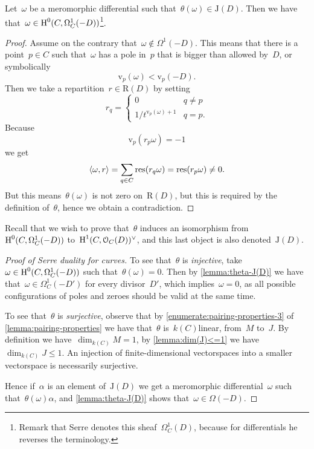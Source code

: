 \documentclass[10pt,a4paper]{article}
\begin{document}
\begin{lemma}
  \label{lemma:theta-J(D)}
  Let~$\omega$ be a meromorphic differential such that~$\theta(\omega)\in\mathrm{J}(D)$. Then we have that~$\omega\in\operatorname{H}^0(C,\Omega_C^1(-D))$\footnote{Remark that Serre denotes this sheaf~$\Omega_C^1(D)$, because for differentials he reverses the terminology.}.

  \begin{proof}
    Assume on the contrary that~$\omega\notin\Omega^1(-D)$. This means that there is a point~$p\in C$ such that~$\omega$ has a pole in~$p$ that is bigger than allowed by~$D$, or symbolically
    \begin{equation}
      \mathrm{v}_p(\omega)<\mathrm{v}_p(-D).
    \end{equation}
    Then we take a repartition~$r\in\mathrm{R}(D)$ by setting
    \begin{equation}
      r_q=
      \begin{cases}
        0 & q\neq p \\
        1/t^{\mathrm{v}_p(\omega)+1} & q=p.
      \end{cases}
    \end{equation}
    Because
    \begin{equation}
      \mathrm{v}_p(r_p\omega)=-1
    \end{equation}
    we get
    \begin{equation}
      \langle\omega,r\rangle=\sum_{q\in C}\operatorname{res}(r_q\omega)=\operatorname{res}(r_p\omega)\neq 0.
    \end{equation}
    But this means~$\theta(\omega)$ is not zero on~$\mathrm{R}(D)$, but this is required by the definition of~$\theta$, hence we obtain a contradiction.
  \end{proof}
\end{lemma}

Recall that we wish to prove that~$\theta$ induces an isomorphism from~$\operatorname{H}^0(C,\Omega_C^1(-D))$ to~$\operatorname{H}^1(C,\mathcal{O}_C(D))^\vee$, and this last object is also denoted~$\mathrm{J}(D)$.
\begin{proof}[Proof of Serre duality for curves]
  To see that~$\theta$ is \emph{injective}, take~$\omega\in\operatorname{H}^0(C,\Omega_C^1(-D))$ such that~$\theta(\omega)=0$. Then by \cref{lemma:theta-J(D)} we have that~$\omega\in\Omega_C^1(-D')$ for every divisor~$D'$, which implies~$\omega=0$, as all possible configurations of poles and zeroes should be valid at the same time.

  To see that~$\theta$ is \emph{surjective}, observe that by \cref{enumerate:pairing-properties-3} of \cref{lemma:pairing-properties} we have that~$\theta$ is~$k(C)$\dash linear, from~$M$ to~$J$. By definition we have~$\dim_{k(C)}M=1$, by \cref{lemma:dim(J)<=1} we have~$\dim_{k(C)}J\leq 1$. An injection of finite-dimensional vectorspaces into a smaller vectorspace is necessarily surjective.

  Hence if~$\alpha$ is an element of~$\mathrm{J}(D)$ we get a meromorphic differential~$\omega$ such that~$\theta(\omega)\alpha$, and \cref{lemma:theta-J(D)} shows that~$\omega\in\Omega(-D)$.
\end{proof}
\end{document}
